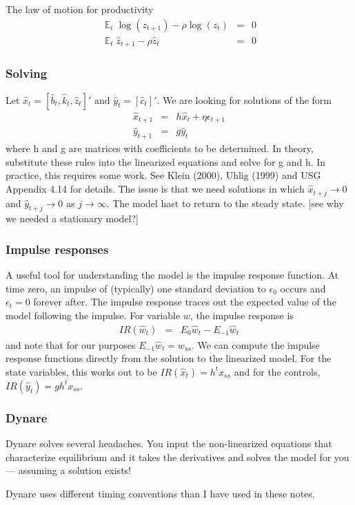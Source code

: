 \documentclass[11pt,pdftex,twoside,letterpaper]{exam}
\DeclareMathOperator{\EX}{\mathbb{E}}%
\begin{document}
The law of motion for productivity
\begin{eqnarray}
  \EX_t \log(z_{t+1}) - \rho \log(z_t) &=& 0\\
  \EX_t \hat{z}_{t+1}-\rho \hat{z}_t &=&0
\end{eqnarray}

\subsubsection{Solving}
Let $\hat{x}_t=[\hat{b}_{t}, \hat{k}_t, \hat{z}_t]'$ and $\hat{y}_t=[\hat{c}_t]'$. We are looking for solutions of the form
\begin{eqnarray}
  \hat{x}_{t+1} &=& h\hat{x}_t+\eta \epsilon_{t+1}\\
  \hat{y}_{t+1} &=& g\hat{y}_t
\end{eqnarray}
where h and g are matrices with coefficients to be determined. In theory, substitute these rules into the linearized equations and solve for g and h. In practice, this requires some work. See Klein (2000), Uhlig (1999) and USG Appendix 4.14 for details. The issue is that we need solutions in which $\hat{x}_{t+j}\rightarrow 0$ and $\hat{y}_{t+j}\rightarrow 0$ as $j\rightarrow \infty$. The model hast to return to the steady state. [see why we needed a stationary model?]

\subsubsection{Impulse responses}
A useful tool for understanding the model is the impulse response function. At time zero, an impulse of (typically) one standard deviation to $\epsilon_0$ occurs and $\epsilon_t=0$ forever after. The impulse response traces out the expected value of the model following the impulse. For variable $w$, the impulse response is
\begin{eqnarray}
  IR(\hat{w}_t) &=& E_0\hat{w}_{t} - E_{-1}\hat{w}_t
\end{eqnarray}
and note that for our purposes $E_{-1}\hat{w}_t = w_{ss}$. We can compute the impulse response functions directly from the solution to the linearized model. For the state variables, this works out to be  $IR(\hat{x}_t)=h^tx_{ss}$ and for the controls, $IR(\hat{y}_t) = gh^tx_{ss}$.

\subsubsection{Dynare}
Dynare solves several headaches. You input the non-linearized equations that characterize equilibrium and it takes the derivatives and solves the model for you --- assuming a solution exists!

Dynare uses different timing conventions than I have used in these notes.
\end{document}
